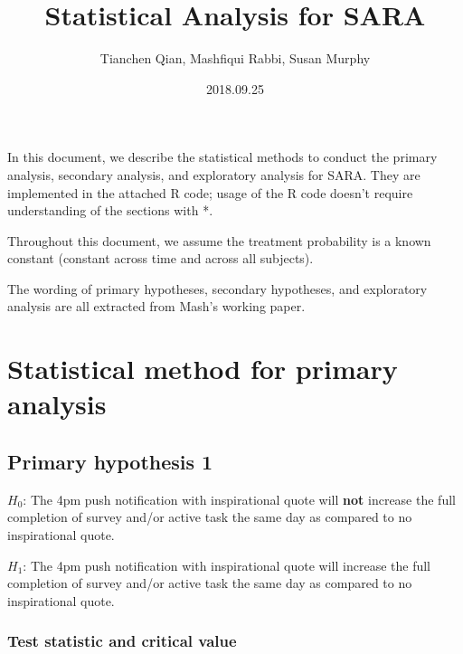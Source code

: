 \documentclass[11pt]{article}
\begin{document}
\title{Statistical Analysis for SARA}

\author{Tianchen Qian, Mashfiqui Rabbi, Susan Murphy}

\date{2018.09.25}

\maketitle
In this document, we describe the statistical methods to conduct the
primary analysis, secondary analysis, and exploratory analysis for
SARA. They are implemented in the attached R code; usage of the R
code doesn't require understanding of the sections with {*}.

Throughout this document, we assume the treatment probability is a
known constant (constant across time and across all subjects).

The wording of primary hypotheses, secondary hypotheses, and exploratory
analysis are all extracted from Mash's working paper.

\section{Statistical method for primary analysis}

\subsection{Primary hypothesis 1\label{subsec:Primary-hypothesis-1}}

$H_{0}$: The 4pm push notification with inspirational quote will
\textbf{not} increase the full completion of survey and/or active
task the same day as compared to no inspirational quote.

$H_{1}$: The 4pm push notification with inspirational quote will
increase the full completion of survey and/or active task the same
day as compared to no inspirational quote.

\subsubsection{Test statistic and critical value}
\end{document}
